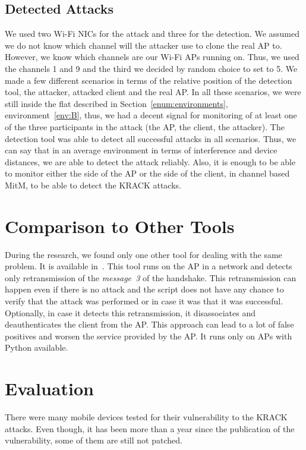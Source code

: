 \subsection{Detected Attacks}
We used two Wi-Fi NICs for the attack and three for the detection. We assumed we do not know which channel will the attacker use to clone the real AP to. However, we know which channels are our Wi-Fi APs running on. Thus, we used the channels 1 and 9 and the third we decided by random choice to set to 5. We made a few different scenarios in terms of the relative position of the detection tool, the attacker, attacked client and the real AP.  
In all these scenarios, we were still inside the flat described in Section~\ref{enum:environments}, environment~\ref{env:B}, thus, we had a decent signal for monitoring of at least one of the three participants in the attack (the AP, the client, the attacker). The detection tool was able to detect all successful attacks in all scenarios. Thus, we can say that in an average environment in terms of interference and device distances, we are able to detect the attack reliably. Also, it is enough to be able to monitor either the side of the AP or the side of the client, in channel based MitM, to be able to detect the KRACK attacks. 

\section{Comparison to Other Tools}

During the research, we found only one other tool for dealing with the same problem. It is available in~\cite{securingsam_2017}. This tool runs on the AP in a network and detects only retransmission of the \textit{message~3} of the handshake. This retransmission can happen even if there is no attack and the script does not have any chance to verify that the attack was performed or in case it was that it was successful. Optionally, in case it detects this retransmission, it disassociates and deauthenticates the client from the AP. This approach can lead to a lot of false positives and worsen the service provided by the AP. It runs only on APs with Python available.

\section{Evaluation}
There were many mobile devices tested for their vulnerability to the KRACK attacks. Even though, it has been more than a year since the publication of the vulnerability, some of them are still not patched. 

